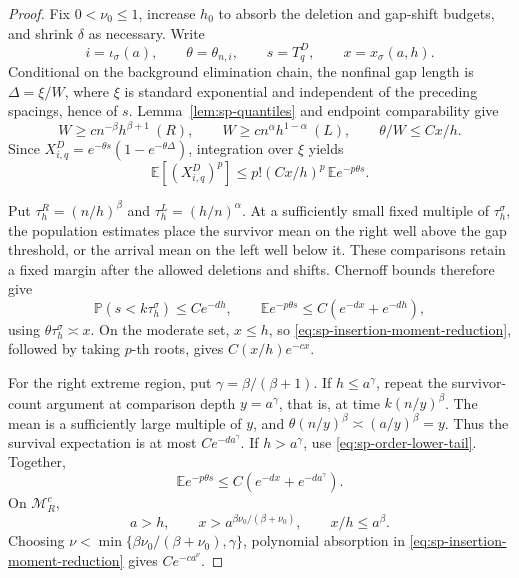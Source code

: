 \documentclass[11pt]{article}
\theoremstyle{remark}
\theoremstyle{plain}
\newcommand{\E}{\mathbb E}
\newcommand{\Pp}{\mathbb P}
\begin{document}
\begin{proof}
Fix $0<\nu_0\le1$, increase $h_0$ to absorb the deletion and gap-shift
budgets, and shrink $\delta$ as necessary.  Write
\[
 i=\iota_\sigma(a),\qquad \theta=\theta_{n,i},\qquad
 s=T_q^D,\qquad x=x_\sigma(a,h).
\]
Conditional on the background elimination chain, the nonfinal gap length
is $\Delta=\xi/W$, where $\xi$ is standard exponential and independent
of the preceding spacings, hence of $s$.  Lemma~\ref{lem:sp-quantiles}
and endpoint comparability give
\[
 W\ge cn^{-\beta}h^{\beta+1}\ (R),\qquad
 W\ge cn^\alpha h^{1-\alpha}\ (L),\qquad \theta/W\le Cx/h.
\]
Since $X_{i,q}^D=e^{-\theta s}(1-e^{-\theta\Delta})$, integration
over $\xi$ yields
\begin{equation}\label{eq:sp-insertion-moment-reduction}
 \E[(X_{i,q}^D)^p]
 \le p!(Cx/h)^p\,\E e^{-p\theta s}.
\end{equation}

Put $\tau_h^R=(n/h)^\beta$ and $\tau_h^L=(h/n)^\alpha$.  At a
sufficiently small fixed multiple of $\tau_h^\sigma$, the population
estimates place the survivor mean on the right well above the gap
threshold, or the arrival mean on the left well below it.  These
comparisons retain a fixed margin after the allowed deletions and shifts.
Chernoff bounds therefore give
\begin{equation}\label{eq:sp-order-lower-tail}
 \Pp(s<k\tau_h^\sigma)\le Ce^{-dh},\qquad
 \E e^{-p\theta s}\le C(e^{-dx}+e^{-dh}),
\end{equation}
using $\theta\tau_h^\sigma\asymp x$.  On the moderate set, $x\le h$,
so \eqref{eq:sp-insertion-moment-reduction}, followed by taking $p$-th
roots, gives $C(x/h)e^{-cx}$.

For the right extreme region, put $\gamma=\beta/(\beta+1)$.  If
$h\le a^\gamma$, repeat the survivor-count argument at comparison depth
$y=a^\gamma$, that is, at time $k(n/y)^\beta$.  The mean is a
sufficiently large multiple of $y$, and
$\theta(n/y)^\beta\asymp(a/y)^\beta=y$.  Thus the survival expectation
is at most $Ce^{-da^\gamma}$.  If $h>a^\gamma$, use
\eqref{eq:sp-order-lower-tail}.  Together,
\begin{equation}\label{eq:sp-right-laplace-extreme}
 \E e^{-p\theta s}\le C(e^{-dx}+e^{-da^\gamma}).
\end{equation}
On $\mathcal M_R^c$,
\[
 a>h,\qquad x>a^{\beta\nu_0/(\beta+\nu_0)},\qquad x/h\le a^\beta.
\]
Choosing
$\nu<\min\{\beta\nu_0/(\beta+\nu_0),\gamma\}$, polynomial absorption
in \eqref{eq:sp-insertion-moment-reduction} gives $Ce^{-ca^\nu}$.


\end{proof}
\end{document}
